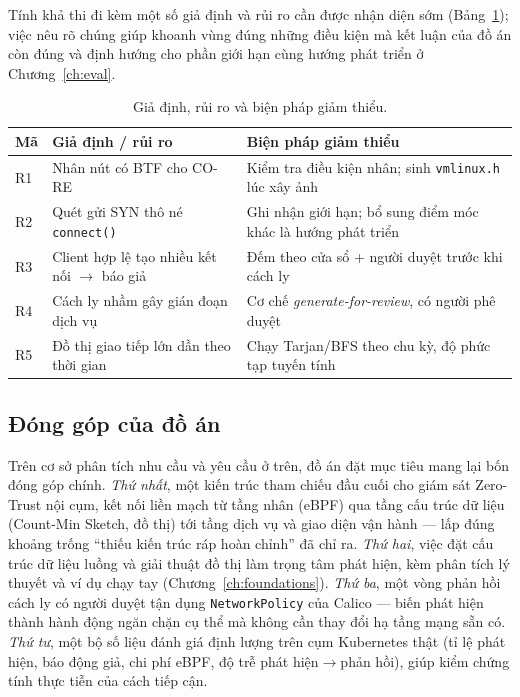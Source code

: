 Tính khả thi đi kèm một số giả định và rủi ro cần được nhận diện sớm
(Bảng~\ref{tab:risk}); việc nêu rõ chúng giúp khoanh vùng đúng những điều kiện mà kết luận
của đồ án còn đúng và định hướng cho phần giới hạn cùng hướng phát triển ở
Chương~\ref{ch:eval}.

\begin{table}[H]
  \centering
  \caption{Giả định, rủi ro và biện pháp giảm thiểu.}
  \label{tab:risk}
  \small
  \begin{tabularx}{\linewidth}{@{}l X X@{}}
    \toprule
    \textbf{Mã} & \textbf{Giả định / rủi ro} & \textbf{Biện pháp giảm thiểu} \\
    \midrule
    R1 & Nhân nút có BTF cho CO-RE        & Kiểm tra điều kiện nhân; sinh \texttt{vmlinux.h} lúc xây ảnh \\
    R2 & Quét gửi SYN thô né \texttt{connect()} & Ghi nhận giới hạn; bổ sung điểm móc khác là hướng phát triển \\
    R3 & Client hợp lệ tạo nhiều kết nối $\rightarrow$ báo giả & Đếm theo cửa sổ + người duyệt trước khi cách ly \\
    R4 & Cách ly nhầm gây gián đoạn dịch vụ & Cơ chế \emph{generate-for-review}, có người phê duyệt \\
    R5 & Đồ thị giao tiếp lớn dần theo thời gian & Chạy Tarjan/BFS theo chu kỳ, độ phức tạp tuyến tính \\
    \bottomrule
  \end{tabularx}
\end{table}

\subsection{Đóng góp của đồ án}
\label{sec:contributions}

Trên cơ sở phân tích nhu cầu và yêu cầu ở trên, đồ án đặt mục tiêu mang lại bốn đóng góp
chính. \emph{Thứ nhất}, một kiến trúc tham chiếu đầu cuối cho giám sát Zero-Trust nội cụm,
kết nối liền mạch từ tầng nhân (eBPF) qua tầng cấu trúc dữ liệu (Count-Min Sketch, đồ thị)
tới tầng dịch vụ và giao diện vận hành --- lấp đúng khoảng trống ``thiếu kiến trúc ráp
hoàn chỉnh'' đã chỉ ra. \emph{Thứ hai}, việc đặt cấu trúc dữ liệu luồng và giải thuật đồ
thị làm trọng tâm phát hiện, kèm phân tích lý thuyết và ví dụ chạy tay (Chương~\ref{ch:foundations}).
\emph{Thứ ba}, một vòng phản hồi cách ly có người duyệt tận dụng \texttt{NetworkPolicy}
của Calico --- biến phát hiện thành hành động ngăn chặn cụ thể mà không cần thay đổi hạ
tầng mạng sẵn có. \emph{Thứ tư}, một bộ số liệu đánh giá định lượng trên cụm Kubernetes
thật (tỉ lệ phát hiện, báo động giả, chi phí eBPF, độ trễ phát hiện$\rightarrow$phản hồi),
giúp kiểm chứng tính thực tiễn của cách tiếp cận.

